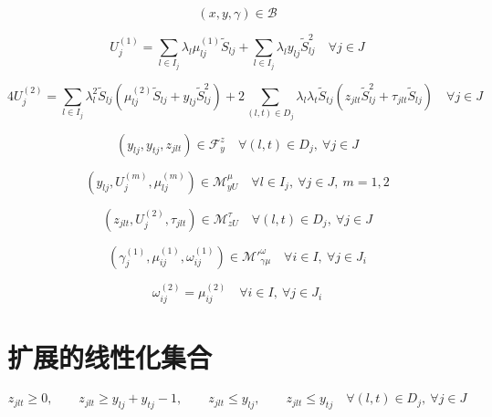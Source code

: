 \documentclass{article}
\begin{document}
\begin{equation}
(x,y,\gamma) \in \mathcal B
\tag{13b}
\end{equation}

\begin{equation}
U_j^{(1)} =
\sum_{l \in I_j} \lambda_l \mu_{lj}^{(1)} \tilde S_{lj}
+
\sum_{l \in I_j} \lambda_l y_{lj} \tilde S_{lj}^{2}
\quad \forall j \in J
\tag{13c}
\end{equation}

\begin{equation}
4U_j^{(2)} =
\sum_{l \in I_j} \lambda_l^2 \tilde S_{lj}
\left(\mu_{lj}^{(2)} \tilde S_{lj} + y_{lj}\tilde S_{lj}^{2}\right)
+
2\sum_{(l,t)\in D_j}\lambda_l\lambda_t \tilde S_{tj}
\left(z_{jlt}\tilde S_{lj}^{2} + \tau_{jlt}\tilde S_{lj}\right)
\quad \forall j \in J
\tag{13d}
\end{equation}

\begin{equation}
(y_{lj}, y_{tj}, z_{jlt}) \in \mathcal F_y^z
\quad \forall (l,t)\in D_j,\ \forall j \in J
\tag{13e}
\end{equation}

\begin{equation}
(y_{lj}, U_j^{(m)}, \mu_{lj}^{(m)}) \in \mathcal M_{yU}^{\mu}
\quad \forall l \in I_j,\ \forall j \in J,\ m=1,2
\tag{13f}
\end{equation}

\begin{equation}
(z_{jlt}, U_j^{(2)}, \tau_{jlt}) \in \mathcal M_{zU}^{\tau}
\quad \forall (l,t)\in D_j,\ \forall j \in J
\tag{13g}
\end{equation}

\begin{equation}
(\gamma_j^{(1)}, \mu_{ij}^{(1)}, \omega_{ij}^{(1)}) \in {\mathcal M'}_{\gamma\mu}^{\omega}
\quad \forall i \in I,\ \forall j \in J_i
\tag{13h}
\end{equation}

\begin{equation}
\omega_{ij}^{(2)} = \mu_{ij}^{(2)}
\quad \forall i \in I,\ \forall j \in J_i
\tag{13i}
\end{equation}

\section*{扩展的线性化集合}
\begin{equation}
z_{jlt} \ge 0,\qquad
z_{jlt} \ge y_{lj} + y_{tj} - 1,\qquad
z_{jlt} \le y_{lj},\qquad
z_{jlt} \le y_{tj}
\quad \forall (l,t)\in D_j,\ \forall j \in J
\tag{Lin-F}
\end{equation}
\end{document}
